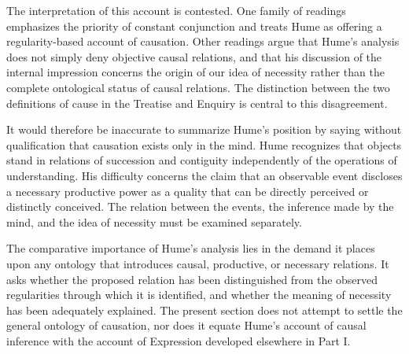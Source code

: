 \label{para:VS.B01.P01.C08.S09.SS05.P004}

The interpretation of this account is contested.
One family of readings emphasizes the priority
of constant conjunction and treats Hume as offering
a regularity-based account of causation. Other
readings argue that Hume's analysis does not simply
deny objective causal relations, and that his
discussion of the internal impression concerns
the origin of our idea of necessity rather than
the complete ontological status of causal relations.
The distinction between the two definitions of
cause in the Treatise and Enquiry is central to
this disagreement.
\cite[1.3.14.31, SBN 169--170]{HumeTreatise}
\cite[7.29, SBN 76--77]{HumeEnquiry}
\cite{StrawsonSecretConnexion1989,QuRadcliffeHume2026}

\label{para:VS.B01.P01.C08.S09.SS05.P005}

It would therefore be inaccurate to summarize Hume's
position by saying without qualification that
causation exists only in the mind. Hume recognizes
that objects stand in relations of succession and
contiguity independently of the operations of
understanding. His difficulty concerns the claim
that an observable event discloses a necessary
productive power as a quality that can be directly
perceived or distinctly conceived. The relation
between the events, the inference made by the mind,
and the idea of necessity must be examined separately.
\cite[1.3.14.28--31, SBN 168--170]{HumeTreatise}

\label{para:VS.B01.P01.C08.S09.SS05.P006}

The comparative importance of Hume's analysis lies
in the demand it places upon any ontology that
introduces causal, productive, or necessary relations.
It asks whether the proposed relation has been
distinguished from the observed regularities through
which it is identified, and whether the meaning of
necessity has been adequately explained. The present
section does not attempt to settle the general
ontology of causation, nor does it equate Hume's
account of causal inference with the account of
Expression developed elsewhere in Part I.




